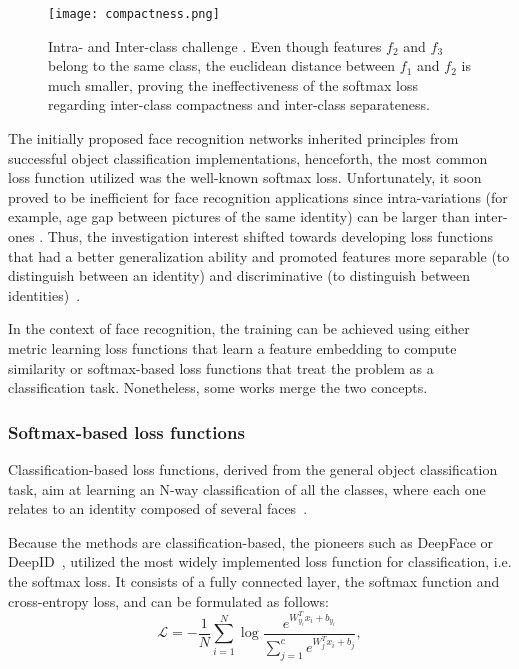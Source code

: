 \documentclass[class=report, crop=false, a4paper, 12pt]{standalone}
\begin{document}
\begin{figure}[H]
    \centering
    \texttt{[image: compactness.png]}
    \caption[Intra- and Inter-class challenge.]{Intra- and Inter-class challenge \autocite{wangNormFaceL2Hypersphere2017}. Even though features $f_2$ and $f_3$ belong to the same class, the euclidean distance between $f_1$ and $f_2$ is much smaller, proving the ineffectiveness of the softmax loss regarding inter-class compactness and inter-class separateness.}
    \label{fig:compactness}
\end{figure}

The initially proposed face recognition networks inherited principles from successful object classification implementations, henceforth, the most common loss function utilized was the well-known softmax loss. Unfortunately, it soon proved to be inefficient for face recognition applications since intra-variations (for example, age gap between pictures of the same identity) can be larger than inter-ones . Thus, the investigation interest shifted towards developing loss functions that had a better generalization ability and promoted features more separable (to distinguish between an identity) and discriminative (to distinguish between identities)~\autocite{wangDeepFaceRecognition2021}.
\par In the context of face recognition, the training can be achieved using either metric learning loss functions that learn a feature embedding to compute similarity or softmax-based loss functions that treat the problem as a classification task. Nonetheless, some works merge the two concepts.

\subsubsection{Softmax-based loss functions}
Classification-based loss functions, derived from the general object classification task, aim at learning an N-way classification of all the classes, where each one relates to an identity composed of several faces~\autocite{duElementsEndtoendDeep2022}.
\par Because the methods are classification-based, the pioneers such as DeepFace or DeepID~\autocite{sunDeepLearningFace2014a}, utilized the most widely implemented loss function for classification, i.e. the softmax loss. It consists of a fully connected layer, the softmax function and cross-entropy loss, and can be formulated as follows:
\begin{equation}
\mathcal{L} = -\frac{1}{N}\sum_{i=1}^{N}\log{\frac{e^{W_{y_i}^{T}x_i+b_{y_i}}}{\sum_{j=1}^{c}e^{W_{j}^{T}x_i+b_{j}}}},
\end{equation}
\end{document}
